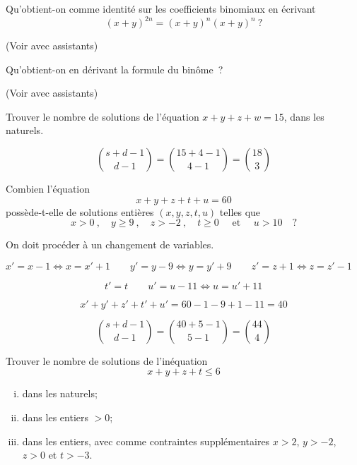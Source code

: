 \begin{exo}
Qu'obtient-on comme identit\'e sur les coefficients binomiaux en \'ecrivant
\[
(x+y)^{2n} = (x+y)^n(x+y)^n\ ?
\]
\end{exo}

(Voir avec assistants)


\begin{exo}
Qu'obtient-on en d\'erivant la formule du bin\^ome~?
\end{exo}

(Voir avec assistants)


\begin{exo}
Trouver le nombre de solutions de l'\'equation $x + y + z + w = 15$, dans les naturels.
\end{exo}

\[ { s + d - 1 \choose d - 1 } = { 15 + 4 - 1 \choose 4 - 1} = {18 \choose 3 } \]

\newpage


\begin{exo} 
Combien l'\'equation
\[
x + y + z + t + u = 60
\]
poss\`ede-t-elle de solutions enti\`eres $(x,y,z,t,u)$ telles que
\[
x > 0\ ,\quad y \geqslant 9\ , \quad z > -2\ , \quad t \geqslant 0 \quad \textrm{ et }  \quad u > 10 \quad ?
\]
\end{exo}

On doit procéder à un changement de variables.

${x}' = x-1 \Leftrightarrow x= {x}'+1 \qquad {y}' = y-9 \Leftrightarrow y= {y}'+9 \qquad {z}' = z+1 \Leftrightarrow z= {z}'-1 $

$\qquad \qquad \qquad \qquad \qquad {t}' = t \qquad {u}' = u-11 \Leftrightarrow u= {u}'+11$

\[ {x}'+{y}'+{z}'+{t}'+{u}' = 60 - 1 - 9 + 1 - 11 = 40 \]

\[{s + d - 1 \choose d - 1} = {40 + 5 - 1 \choose 5 - 1} = {44 \choose 4} \]

\begin{exo} 
Trouver le nombre de solutions de l'in\'equation
\[
x + y + z + t \leqslant 6
\]
%
\begin{enumerate}[(i)]
\item dans les naturels;
\item dans les entiers $>0$;
\item dans les entiers, avec comme contraintes suppl\'ementaires $x > 2$, $y > -2$, $z > 0$ et $t > -3$.
\end{enumerate}
\end{exo}

